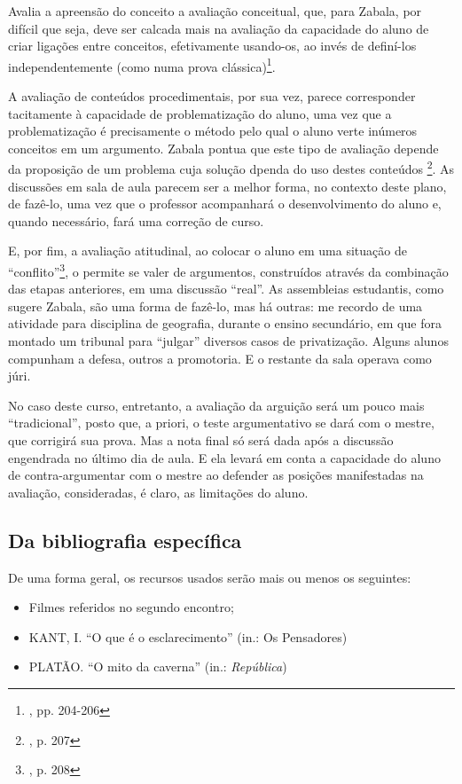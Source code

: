 \documentclass[12pt,a4paper]{article}
\begin{document}
	Avalia a apreensão do conceito a avaliação conceitual, que, para 
	Zabala, por difícil que seja, deve ser calcada mais na avaliação 
	da capacidade do aluno de criar ligações entre conceitos, efetivamente 
	usando-os, ao invés de definí-los independentemente (como numa prova 
	clássica)\footnote{\cite{zabala}, pp. 204-206}. 

	A avaliação de conteúdos procedimentais, por sua vez, parece 
	corresponder tacitamente à capacidade de problematização do aluno, 
	uma vez que a problematização é precisamente o método pelo qual o 
	aluno verte inúmeros conceitos em um argumento. Zabala pontua que 
	este tipo de avaliação depende da proposição de um problema cuja 
	solução dpenda do uso destes conteúdos
	\footnote{\cite{zabala}, p. 207}. As discussões em sala de aula 
	parecem ser a melhor forma, no contexto deste plano, de fazê-lo, uma 
	vez que o professor acompanhará o desenvolvimento do aluno e, quando 
	necessário, fará uma correção de curso. 

	E, por fim, a avaliação atitudinal, ao colocar o aluno em uma situação 
	de “conflito”\footnote{\cite{zabala}, p. 208}, o permite se valer de 
	argumentos, construídos através da combinação das etapas anteriores, 
	em uma discussão “real”. As assembleias estudantis, como sugere 
	Zabala, são uma forma de fazê-lo, mas há outras: me recordo de uma 
	atividade para disciplina de geografia, durante o ensino secundário, 
	em que fora montado um tribunal para “julgar” diversos casos de 
	privatização. Alguns alunos compunham a defesa, outros a promotoria. 
	E o restante da sala operava como júri. 

	No caso deste curso, entretanto, a avaliação da arguição será um 
	pouco mais “tradicional”, posto que, a priori, o teste argumentativo 
	se dará com o mestre, que corrigirá sua prova. Mas a nota final só 
	será dada após a discussão engendrada no último dia de aula. E ela 
	levará em conta a capacidade do aluno de contra-argumentar com o 
	mestre ao defender as posições manifestadas na avaliação, consideradas, 
	é claro, as limitações do aluno. 

	\subsection{Da bibliografia específica}
	
	De uma forma geral, os recursos usados serão mais ou menos os seguintes: 
	\begin{itemize}
		\item Filmes referidos no segundo encontro; 
		\item KANT, I. “O que é o esclarecimento” (in.: Os Pensadores)
		\item PLATÃO. “O mito da caverna” (in.: \textit{República})
	\end{itemize}
\end{document}
